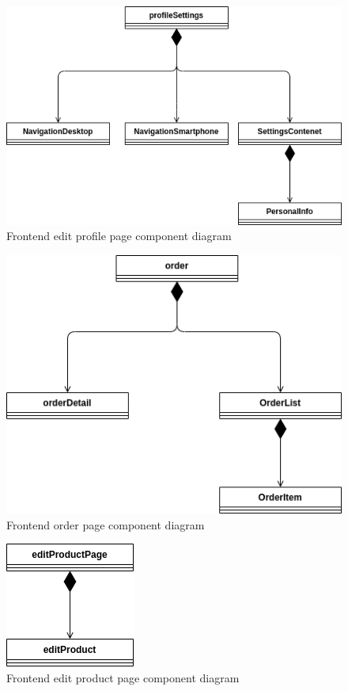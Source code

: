 \begin{figure}[!ht]
  \caption{ Frontend edit profile page component diagram}
  \vspace{10px}
  \includegraphics[scale=0.39]{../../../../Images/Diagrammi/maintainerManual/FE/EditProfileDiagram.png}
  \centering
\end{figure}
\begin{figure}[!ht]
  \caption{ Frontend order page component diagram}
  \vspace{10px}
  \includegraphics[scale=0.39]{../../../../Images/Diagrammi/maintainerManual/FE/orderDiagram.png}
  \centering
\end{figure}
\begin{figure}[!ht]
  \caption{ Frontend edit product page component diagram}
  \vspace{10px}
  \includegraphics[scale=0.39]{../../../../Images/Diagrammi/maintainerManual/FE/editProductDiagram.png}
  \centering
\end{figure}
